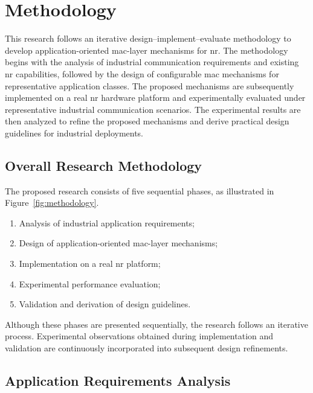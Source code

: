 \documentclass[12pt,a4paper]{article}
\begin{document}
\section{Methodology}

This research follows an iterative design--implement--evaluate methodology to develop application-oriented \gls{mac}-layer mechanisms for \gls{nr}. The methodology begins with the analysis of industrial communication requirements and existing \gls{nr} capabilities, followed by the design of configurable \gls{mac} mechanisms for representative application classes. The proposed mechanisms are subsequently implemented on a real \gls{nr} hardware platform and experimentally evaluated under representative industrial communication scenarios. The experimental results are then analyzed to refine the proposed mechanisms and derive practical design guidelines for industrial deployments.


\subsection{Overall Research Methodology}

The proposed research consists of five sequential phases, as illustrated in Figure~\ref{fig:methodology}.

\begin{enumerate}
\item Analysis of industrial application requirements;
\item Design of application-oriented \gls{mac}-layer mechanisms;
\item Implementation on a real \gls{nr} platform;
\item Experimental performance evaluation;
\item Validation and derivation of design guidelines.
\end{enumerate}

Although these phases are presented sequentially, the research follows an iterative process. Experimental observations obtained during implementation and validation are continuously incorporated into subsequent design refinements.


\subsection{Application Requirements Analysis}
\end{document}
